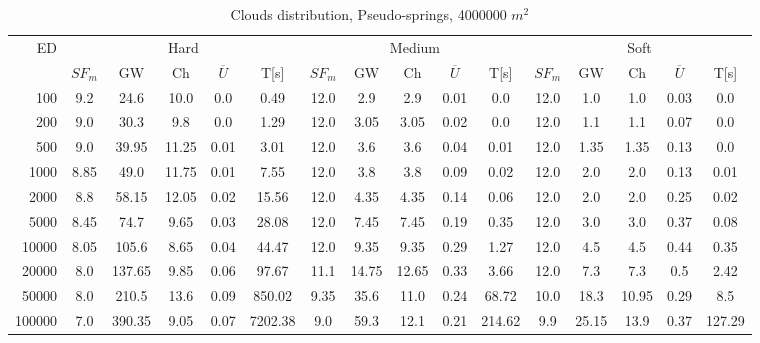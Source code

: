 \begin{table}[htb]
	\centering
	\footnotesize
	\begin{tabular}{|r|c|c|c|c|c|c|c|c|c|c|c|c|c|c|c|} 
		\hline
		\multirow{2}{*}{ED} & \multicolumn{5}{c|}{Hard} & \multicolumn{5}{c|}{Medium} &\multicolumn{5}{c|}{Soft} \\ 
		\cline{2-16} 
		&$SF_{m}$&GW & Ch & $\overline{U}$&T[s] &$SF_{m}$&GW & Ch & $\overline{U}$ &T[s] &$SF_{m}$&GW & Ch & $\overline{U}$  & T[s]  \\ 
		\hline 
		100 & 9.2 & 24.6 & 10.0 & 0.0 & 0.49 & 12.0 & 2.9 & 2.9 & 0.01 & 0.0 & 12.0 & 1.0 & 1.0 & 0.03 & 0.0\\ 
		200 & 9.0 & 30.3 & 9.8 & 0.0 & 1.29 & 12.0 & 3.05 & 3.05 & 0.02 & 0.0 & 12.0 & 1.1 & 1.1 & 0.07 & 0.0\\ 
		500 & 9.0 & 39.95 & 11.25 & 0.01 & 3.01 & 12.0 & 3.6 & 3.6 & 0.04 & 0.01 & 12.0 & 1.35 & 1.35 & 0.13 & 0.0\\ 
		1000 & 8.85 & 49.0 & 11.75 & 0.01 & 7.55 & 12.0 & 3.8 & 3.8 & 0.09 & 0.02 & 12.0 & 2.0 & 2.0 & 0.13 & 0.01\\ 
		2000 & 8.8 & 58.15 & 12.05 & 0.02 & 15.56 & 12.0 & 4.35 & 4.35 & 0.14 & 0.06 & 12.0 & 2.0 & 2.0 & 0.25 & 0.02\\ 
		5000 & 8.45 & 74.7 & 9.65 & 0.03 & 28.08 & 12.0 & 7.45 & 7.45 & 0.19 & 0.35 & 12.0 & 3.0 & 3.0 & 0.37 & 0.08\\ 
		10000 & 8.05 & 105.6 & 8.65 & 0.04 & 44.47 & 12.0 & 9.35 & 9.35 & 0.29 & 1.27 & 12.0 & 4.5 & 4.5 & 0.44 & 0.35\\ 
		20000 & 8.0 & 137.65 & 9.85 & 0.06 & 97.67 & 11.1 & 14.75 & 12.65 & 0.33 & 3.66 & 12.0 & 7.3 & 7.3 & 0.5 & 2.42\\ 
		50000 & 8.0 & 210.5 & 13.6 & 0.09 & 850.02 & 9.35 & 35.6 & 11.0 & 0.24 & 68.72 & 10.0 & 18.3 & 10.95 & 0.29 & 8.5\\ 
		100000 & 7.0 & 390.35 & 9.05 & 0.07 & 7202.38 & 9.0 & 59.3 & 12.1 & 0.21 & 214.62 & 9.9 & 25.15 & 13.9 & 0.37 & 127.29\\ 
		\hline 
	\end{tabular} 
	\caption{Clouds distribution, Pseudo-springs, 4000000 $m^2$} 
	\label{tab:UnSprings2000} 
\end{table} 
